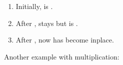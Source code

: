 \documentclass[letterpaper,10pt,english]{jupyterBook}
\begin{document}
\begin{enumerate}
%
\item {} 
\sphinxAtStartPar
Initially,  is \sphinxcode{\sphinxupquote{{[}1, 1, 1, 1, 1{]}}}.

\item {} 
\sphinxAtStartPar
After ,  stays \sphinxcode{\sphinxupquote{{[}1, 1, 1, 1, 1{]}}} but  is \sphinxcode{\sphinxupquote{{[}6, 6, 6, 6, 6{]}}}.

\item {} 
\sphinxAtStartPar
After , now  has become \sphinxcode{\sphinxupquote{{[}6, 6, 6, 6, 6{]}}} in\sphinxhyphen{}place.

\end{enumerate}

\sphinxAtStartPar
Another example with multiplication:
\end{document}
